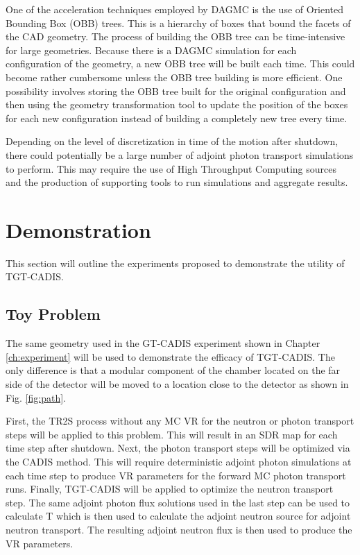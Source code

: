 One of the acceleration techniques employed by DAGMC is the use of Oriented
Bounding Box (OBB) trees.  This is a hierarchy of boxes that bound the facets 
of the CAD geometry.  The process of building the OBB tree can be
time-intensive for large geometries.  Because there is a DAGMC simulation for
each configuration of the geometry, a new OBB tree will be built each time.  This could
become rather cumbersome unless the OBB tree building is more efficient.
One possibility involves storing the OBB
tree built for the original configuration and then using the geometry
transformation tool to update the position of the boxes for each 
new configuration instead of building a completely new tree every time.

Depending on the level of discretization in time of the motion after shutdown,
there could potentially be a large number of adjoint photon transport
simulations to perform.  This may require the use of High Throughput Computing
sources and the production of supporting tools to run simulations and aggregate
results.

\section{Demonstration} \label{sec:demo}
This section will outline the experiments proposed to demonstrate the utility
of TGT-CADIS.  

\subsection{Toy Problem}
The same geometry used in the GT-CADIS experiment shown in Chapter \ref{ch:experiment}
will be used to demonstrate the efficacy of TGT-CADIS.  The only difference
is that a modular component of the chamber located on the far side of the
detector will be moved to a location close to the detector as shown in Fig.
\ref{fig:path}.  


First, the TR2S process without any MC VR for the neutron or photon transport
steps will be applied to this problem.  This will result in an SDR map for each
time step after shutdown.
Next, the photon transport steps will be optimized via the CADIS method.  This
will require deterministic adjoint photon simulations at each time step to
produce VR parameters for the forward MC photon transport runs.
Finally, TGT-CADIS will be applied to optimize the neutron transport step.  The
same adjoint photon flux solutions used in the last step can be used to
calculate T which is then used to calculate the adjoint neutron source for
adjoint neutron transport. The resulting adjoint neutron flux is then used to
produce the VR parameters.

